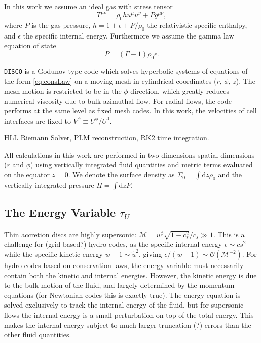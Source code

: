 \documentclass{emulateapj}
\newcommand{\Gam}{\Gamma}
\newcommand{\eps}{\epsilon}
\newcommand{\Sig}{\Sigma}
\newcommand{\Mach}{\mathcal{M}}
\newcommand{\dd}{\mbox{d}}
\newcommand{\DISCO}{{\texttt{DISCO}}}
\newcommand{\OO}{\mathcal{O}}
\begin{document}
In this work we assume an ideal gas with stress tensor
\begin{equation}
	T^{\mu\nu} = \rho_0 h u^\mu u^\nu + P g^{\mu\nu} ,
\end{equation}
where $P$ is the gas pressure, $h = 1 + \eps + P/\rho_0$ the relativistic specific enthalpy, and $\eps$ the specific internal energy. Furthermore we assume the gamma law equation of state
\begin{equation}
	P = (\Gam - 1) \rho_0 \eps . \label{eq:gammalaw}
\end{equation}

\DISCO{} is a Godunov type code which solves hyperbolic systems of equations of the form \eqref{eq:consLaw} on a moving mesh in cylindrical coordinates ($r$, $\phi$, $z$).  The mesh motion is restricted to be in the $\phi$-direction, which greatly reduces numerical viscosity due to bulk azimuthal flow.  For radial flows, the code performs at the same level as fixed mesh codes.  In this work, the velocities of cell interfaces are fixed to $V^\phi \equiv U^\phi/U^0$.   

HLL Riemann Solver, PLM reconstruction, RK2 time integration.

All calculations in this work are performed in two dimensions spatial dimensions ($r$ and $\phi$) using vertically integrated fluid quantities and metric terms evaluated on the equator $z=0$.  We denote the surface density as $\Sig_0 = \int \dd z \rho_0$ and the vertically integrated pressure $\Pi = \int \dd z P$.  

\subsection{The Energy Variable $\tau_U$}
\label{subsec:energy}

Thin accretion discs are highly supersonic: $\Mach = u^{\hat{\phi}} \sqrt{1-c_s^2}/c_s \gg 1$.  This is a challenge for (grid-based?) hydro codes, as the specific internal energy $\eps \sim cs^2$ while the specific kinetic energy $w-1 \sim \tilde{u}^2$, giving $\eps / (w-1) \sim \OO(\Mach^{-2})$.  For hydro codes based on conservation laws, the energy variable must necessarily contain both the kinetic and internal energies.  However, the kinetic energy is due to the bulk motion of the fluid, and largely determined by the momentum equations (for Newtonian codes this is exactly true).  The energy equation is solved exclusively to track the internal energy of the fluid, but for supersonic flows the internal energy is a small perturbation on top of the total energy.  This makes the internal energy subject to much larger truncation (?) errors than the other fluid quantities.
\end{document}
